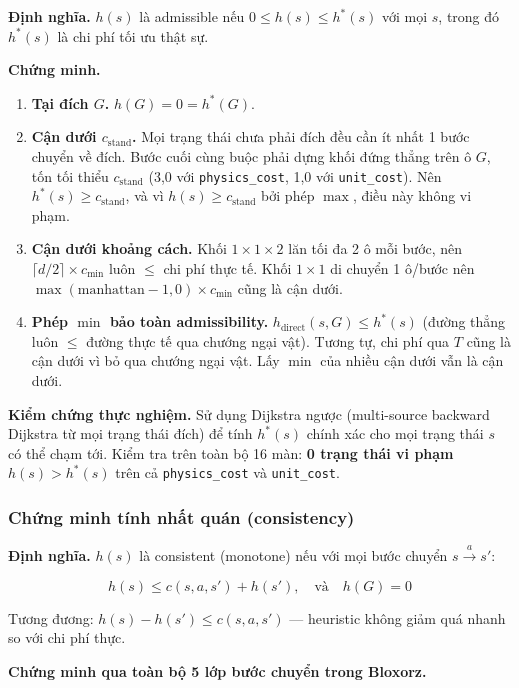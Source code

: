 \textbf{Định nghĩa.} $h(s)$ là admissible nếu $0 \le h(s) \le h^*(s)$ với mọi $s$, trong đó $h^*(s)$ là chi phí tối ưu thật sự.

\textbf{Chứng minh.}

\begin{enumerate}
\item \textbf{Tại đích $G$.} $h(G) = 0 = h^*(G)$.
\item \textbf{Cận dưới $c_{\text{stand}}$.} Mọi trạng thái chưa phải đích đều cần ít nhất 1 bước chuyển về đích. Bước cuối cùng buộc phải dựng khối đứng thẳng trên ô $G$, tốn tối thiểu $c_{\text{stand}}$ (3,0 với \texttt{physics\_\allowbreak{}cost}, 1,0 với \texttt{unit\_\allowbreak{}cost}). Nên $h^*(s) \ge c_{\text{stand}}$, và vì $h(s) \ge c_{\text{stand}}$ bởi phép $\max$, điều này không vi phạm.
\item \textbf{Cận dưới khoảng cách.} Khối $1\times 1\times 2$ lăn tối đa 2 ô mỗi bước, nên $\lceil d/2 \rceil \times c_{\min}$ luôn $\le$ chi phí thực tế. Khối $1\times 1$ di chuyển 1 ô/bước nên $\max(\text{manhattan} - 1, 0) \times c_{\min}$ cũng là cận dưới.
\item \textbf{Phép $\min$ bảo toàn admissibility.} $h_{\text{direct}}(s, G) \le h^*(s)$ (đường thẳng luôn $\le$ đường thực tế qua chướng ngại vật). Tương tự, chi phí qua $T$ cũng là cận dưới vì bỏ qua chướng ngại vật. Lấy $\min$ của nhiều cận dưới vẫn là cận dưới.
\end{enumerate}

\textbf{Kiểm chứng thực nghiệm.} Sử dụng Dijkstra ngược (multi-source backward Dijkstra từ mọi trạng thái đích) để tính $h^*(s)$ chính xác cho mọi trạng thái $s$ có thể chạm tới. Kiểm tra trên toàn bộ 16 màn: \textbf{0 trạng thái vi phạm} $h(s) > h^*(s)$ trên cả \texttt{physics\_\allowbreak{}cost} và \texttt{unit\_\allowbreak{}cost}.

\subsubsection{Chứng minh tính nhất quán (consistency)}

\textbf{Định nghĩa.} $h(s)$ là consistent (monotone) nếu với mọi bước chuyển $s \xrightarrow{a} s'$:

\[h(s) \le c(s, a, s') + h(s'), \quad \text{và}\quad h(G) = 0\]

Tương đương: $h(s) - h(s') \le c(s, a, s')$ — heuristic không giảm quá nhanh so với chi phí thực.

\textbf{Chứng minh qua toàn bộ 5 lớp bước chuyển trong Bloxorz.}


